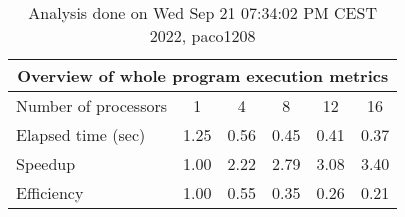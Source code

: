 \begin{table}[h]
\begin{center}
\begin{tabular}{|l|c|c|c|c|c|}
\hline
\multicolumn{6}{|c|}{Overview of whole program execution metrics} \\
\hline
\hline
Number of processors & 1 & 4 & 8 & 12 & 16 \\
\hline
Elapsed time (sec)      &       1.25 &       0.56 &       0.45 &       0.41 &       0.37 \\
\hline
Speedup                 &       1.00 &       2.22 &       2.79 &       3.08 &       3.40 \\
\hline
Efficiency              &       1.00 &       0.55 &       0.35 &       0.26 &       0.21 \\
\hline
\end{tabular}
\end{center}
\caption{ Analysis done on Wed Sep 21 07:34:02 PM CEST 2022, paco1208}
\end{table}

